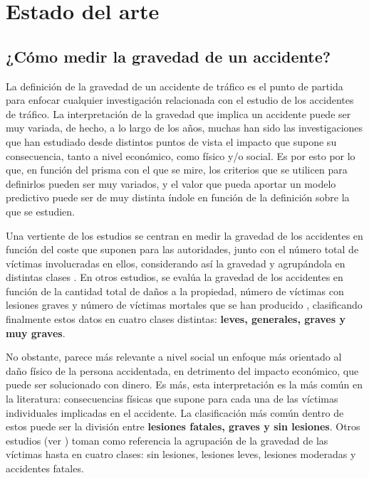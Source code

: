 \documentclass{uathesis-es}
\begin{document}
\chapter{Estado del arte}

\section{¿Cómo medir la gravedad de un accidente?}

La definición de la gravedad de un accidente de tráfico es el punto de partida para enfocar cualquier investigación relacionada con el estudio de los accidentes de tráfico. La interpretación de la gravedad que implica un accidente puede ser muy variada, de hecho, a lo largo de los años, muchas han sido las investigaciones que han estudiado desde distintos puntos de vista el impacto que supone su consecuencia, tanto a nivel económico, como físico y/o social. Es por esto por lo que, en función del prisma con el que se mire, los criterios que se utilicen para definirlos pueden ser muy variados, y el valor que pueda aportar un modelo predictivo puede ser de muy distinta índole en función de la definición sobre la que se estudien.


Una vertiente de los estudios se centran en medir la gravedad de los accidentes en función del coste que suponen para las autoridades, junto con el número total de víctimas involucradas en ellos, considerando así la gravedad y agrupándola en distintas clases \cite{app7060476}. En otros estudios, se evalúa la gravedad de los accidentes en función de la cantidad total de daños a la propiedad, número de víctimas con lesiones graves y número de víctimas mortales que se han producido \cite{Yang2023}, clasificando finalmente estos datos en cuatro clases distintas: \textbf{leves, generales, graves y muy graves}.

No obstante, parece más relevante a nivel social un enfoque más orientado al daño físico de la persona accidentada, en detrimento del impacto económico, que puede ser solucionado con dinero. Es más, esta interpretación es la más común en la literatura: consecuencias físicas que supone para cada una de las víctimas individuales implicadas en el accidente. La clasificación más común dentro de estos puede ser la división entre \textbf{lesiones fatales, graves y sin lesiones}. Otros estudios (ver \cite{panicker2022injury}) toman como referencia la agrupación de la gravedad de las víctimas hasta en cuatro clases: sin lesiones, lesiones leves, lesiones moderadas y accidentes fatales.
\end{document}
